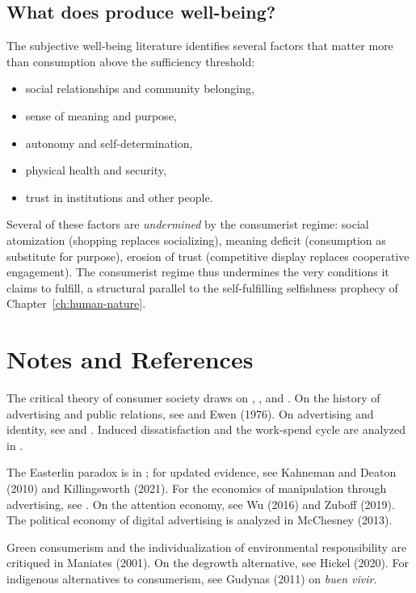 \subsection{What does produce well-being?}

The subjective well-being literature identifies several factors that matter more than consumption above the sufficiency threshold:
\begin{itemize}[nosep]
  \item social relationships and community belonging,
  \item sense of meaning and purpose,
  \item autonomy and self-determination,
  \item physical health and security,
  \item trust in institutions and other people.
\end{itemize}

Several of these factors are \emph{undermined} by the consumerist regime: social atomization (shopping replaces socializing), meaning deficit (consumption as substitute for purpose), erosion of trust (competitive display replaces cooperative engagement).
The consumerist regime thus undermines the very conditions it claims to fulfill, a structural parallel to the self-fulfilling selfishness prophecy of Chapter~\ref{ch:human-nature}.

\section{Notes and References}
\label{sec:ch23-notes}

The critical theory of consumer society draws on \textcite{adorno1944}, \textcite{debord1967}, and \textcite{fromm1976}.
On the history of advertising and public relations, see \textcite{bernays1928} and Ewen (1976).
On advertising and identity, see \textcite{veblen1899} and \textcite{galbraith1958}.
Induced dissatisfaction and the work-spend cycle are analyzed in \textcite{schor1998}.

The Easterlin paradox is in \textcite{easterlin1974}; for updated evidence, see Kahneman and Deaton (2010) and Killingsworth (2021).
For the economics of manipulation through advertising, see \textcite{akerlof2015}.
On the attention economy, see Wu (2016) and Zuboff (2019).
The political economy of digital advertising is analyzed in McChesney (2013).

Green consumerism and the individualization of environmental responsibility are critiqued in Maniates (2001).
On the degrowth alternative, see Hickel (2020).
For indigenous alternatives to consumerism, see Gudynas (2011) on \emph{buen vivir}.

